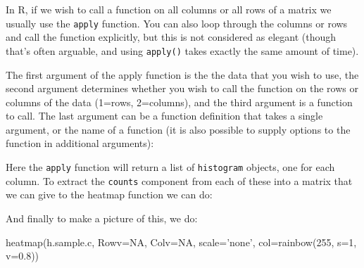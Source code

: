 \documentclass[11pt]{article}
\begin{document}
In R, if we wish to call a function on all columns or all rows of a
matrix we usually use the \texttt{apply} function. You can also loop
through the columns or rows and call the function explicitly, but
this is not considered as elegant (though that's often arguable, and
using \texttt{apply()} takes exactly the same amount of time).

The first argument of the apply function is the the data that you wish
to use, the second argument determines whether you wish to call the
function on the rows or columns of the data (1=rows, 2=columns), and
the third argument is a function to call. The last argument can
be a function definition that takes a single argument, or the name of
a function (it is also possible to supply options to the function in
additional arguments):


Here the \texttt{apply} function will return a list of \texttt{histogram} objects,
one for each column. To extract the \texttt{counts} component from
each of these into a matrix that we can give to the heatmap function we can do:


And finally to make a picture of this, we do:

\begin{rcode}
  heatmap(h.sample.c, Rowv=NA, Colv=NA, scale='none', col=rainbow(255, s=1, v=0.8))
\end{rcode}
\end{document}
